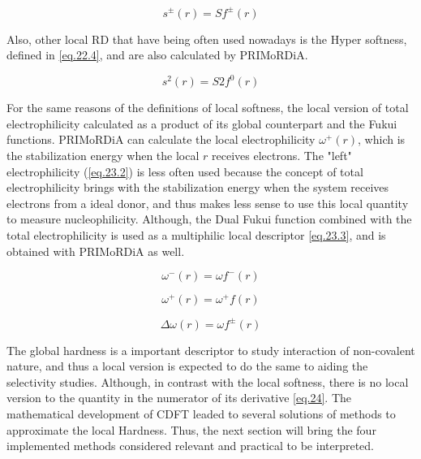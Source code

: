 \documentclass[a4paper,11pt]{refart}
\begin{document}
\begin{equation}
s^{\pm}(r) = Sf^{\pm}(r)
\label{eq.22.3}
\end{equation}

Also, other local RD that have being often used nowadays is the Hyper softness, defined in \autoref{eq.22.4}, and are also calculated by PRIMoRDiA. 

\begin{equation}
s^{2}(r) = S2f^{0}(r)
\label{eq.22.4}
\end{equation}

For the same reasons of the definitions of local softness, the local version of total electrophilicity calculated as a product of its global counterpart and the Fukui functions\cite{noorizadeh2013evaluation}. PRIMoRDiA can calculate the local electrophilicity $\omega^+(r)$, which is the stabilization energy when the local $r$ receives electrons. The "left" electrophilicity (\autoref{eq.23.2}) is less often used because the concept of total electrophilicity brings with the stabilization energy when the system receives electrons from a ideal donor, and thus makes less sense to use this local quantity to measure nucleophilicity. Although, the Dual Fukui function combined with the total electrophilicity is used as a multiphilic local descriptor \autoref{eq.23.3}, and is obtained with PRIMoRDiA as well\cite{padmanabhan2007multiphilic}.  

\begin{equation}
\omega^-(r) = \omega f^-(r)
\label{eq.23.1}
\end{equation}

\begin{equation}
\omega^+(r) = \omega^+ f(r)
\label{eq.23.2}
\end{equation}

\begin{equation}
\Delta \omega(r) = \omega f^{\pm}(r)
\label{eq.23.3}
\end{equation}

The global hardness is a important descriptor to study interaction of non-covalent nature, and thus a local version is expected to do the same to aiding the selectivity studies. Although, in contrast with the local softness, there is no local version to the quantity in the numerator of its derivative \autoref{eq.24}. The mathematical development of CDFT leaded to several solutions of methods to approximate the local Hardness. Thus, the next section will bring the four implemented methods considered relevant and practical to be interpreted. 
\end{document}

